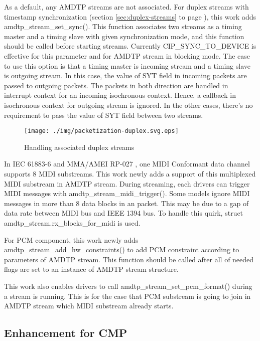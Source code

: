 \documentclass[onecolumn]{article}
\begin{document}
As a default, any AMDTP streams are not associated. For duplex streams with timestamp synchronization (section \ref{sec:duplex-streams} to page \pageref{sec:duplex-streams}), this work adds amdtp\_stream\_set\_sync(). This function associates two streams as a timing master and a timing slave with given synchronization mode, and this function should be called before starting streams. Currently CIP\_SYNC\_TO\_DEVICE is effective for this parameter and for AMDTP stream in blocking mode. The case to use this option is that a timing master is incoming stream and a timing slave is outgoing stream. In this case, the value of SYT field in incoming packets are passed to outgoing packets. The packets in both direction are handled in interrupt context for an incoming isochronous context. Hence, a callback in isochronous context for outgoing stream is ignored. In the other cases, there's no requirement to pass the value of SYT field between two streams.

\begin{figure}[H]
	\centering
	\texttt{[image: ./img/packetization-duplex.svg.eps]}
	\caption{{Handling associated duplex streams}}
	\label{fig:packetization-duplex}
\end{figure}


In IEC 61883-6 \cite{iec61883-6-1, iec61883-6-2} and MMA/AMEI RP-027 \cite{amei-rp27}, one MIDI Conformant data channel supports 8 MIDI substreams. This work newly adds a support of this multiplexed MIDI substream in AMDTP stream. During streaming, each drivers can trigger MIDI messages with amdtp\_stream\_midi\_trigger(). Some models ignore MIDI messages in more than 8 data blocks in an packet. This may be due to a gap of data rate between MIDI bus and IEEE 1394 bus. To handle this quirk, struct amdtp\_stream.rx\_blocks\_for\_midi is used.

For PCM component, this work newly adds amdtp\_stream\_add\_hw\_constraints() to add PCM constraint according to parameters of AMDTP stream. This function should be called after all of needed flags are set to an instance of AMDTP stream structure.

This work also enables drivers to call amdtp\_stream\_set\_pcm\_format() during a stream is running. This is for the case that PCM substream is going to join in AMDTP stream which MIDI substream already starts.

\subsection{Enhancement for CMP}
\end{document}
